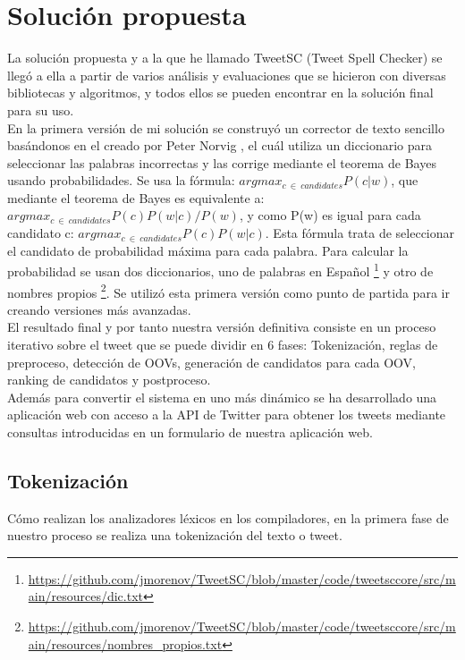 \documentclass[spanish,12pt, a4paper,twoside]{paper}
\let\oldsection\section
\def\section{\cleardoublepage\oldsection}
\begin{document}
\section{Solución propuesta}\label{sec:solucionpropuesta}
La solución propuesta y a la que he llamado TweetSC (Tweet Spell Checker) \cite{tweetscweb} se llegó a ella a partir de varios análisis y evaluaciones que se hicieron con diversas bibliotecas y algoritmos, y todos ellos se pueden encontrar en la solución final para su uso.\\

En la primera versión de mi solución se construyó un corrector de texto sencillo basándonos en el creado por Peter Norvig \cite{peternorvig}, el cuál utiliza un diccionario para seleccionar las palabras incorrectas y las corrige mediante el teorema de Bayes usando probabilidades. Se usa la fórmula: $argmax_{c\ \in\  candidates}P(c|w)$, que mediante el teorema de Bayes es equivalente a: $argmax_{c\ \in\  candidates}P(c) P(w|c) / P(w)$, y como P(w) es igual para cada candidato c: $argmax_{c\ \in\  candidates}P(c) P(w|c)$. Esta fórmula trata de seleccionar el candidato de probabilidad máxima para cada palabra. Para calcular la probabilidad se usan dos diccionarios, uno de palabras en Español \footnote{\url{https://github.com/jmorenov/TweetSC/blob/master/code/tweetsccore/src/main/resources/dic.txt}} y otro de nombres propios \footnote{\url{https://github.com/jmorenov/TweetSC/blob/master/code/tweetsccore/src/main/resources/nombres_propios.txt}}. Se utilizó esta primera versión como punto de partida para ir creando versiones más avanzadas.\\

El resultado final y por tanto nuestra versión definitiva consiste en un proceso iterativo sobre el tweet que se puede dividir en 6 fases: Tokenización, reglas de preproceso, detección de OOVs, generación de candidatos para cada OOV, ranking de candidatos y postproceso.\\

Además para convertir el sistema en uno más dinámico se ha desarrollado una aplicación web con acceso a la API de Twitter para obtener los tweets mediante consultas introducidas en un formulario de nuestra aplicación web.

\subsection{Tokenización}\label{sec:tokenizacion}
Cómo realizan los analizadores léxicos en los compiladores, en la primera fase de nuestro proceso se realiza una tokenización del texto o tweet.\\
\end{document}
